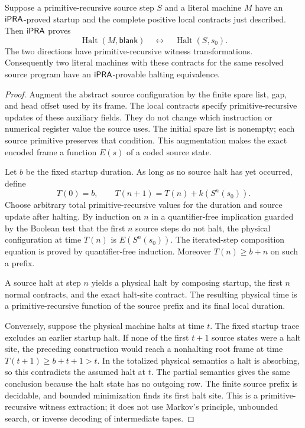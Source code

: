 \begin{theorem}\label{thm:physical}
Suppose a primitive-recursive source step $S$ and a literal machine $M$
have an $\mathsf{iPRA}$-proved startup and the complete positive local contracts
just described. Then $\mathsf{iPRA}$ proves
\[
 \operatorname{Halt}(M,\mathsf{blank})
 \quad\longleftrightarrow\quad
 \operatorname{Halt}(S,s_0).
\]
The two directions have primitive-recursive witness transformations.
Consequently two literal machines with these contracts for the same
resolved source program have an $\mathsf{iPRA}$-provable halting equivalence.
\end{theorem}
\begin{proof}
Augment the abstract source configuration by the finite spare list, gap,
and head offset used by its frame. The local contracts specify
primitive-recursive updates of these auxiliary fields. They do not change
which instruction or numerical register value the source uses. The
initial spare list is nonempty; each source primitive preserves that
condition. This augmentation makes the exact encoded frame a function
$E(s)$ of a coded source state.

Let $b$ be the fixed startup duration. As long as no source halt has yet
occurred, define
\[
 T(0)=b,\qquad T(n+1)=T(n)+k(S^n(s_0)).
\]
Choose arbitrary total primitive-recursive values for the duration and
source update after halting. By induction on $n$ in a quantifier-free
implication guarded by the Boolean test that the first $n$ source steps
do not halt, the physical configuration at time $T(n)$ is $E(S^n(s_0))$.
The iterated-step composition equation is proved by quantifier-free
induction. Moreover $T(n)\ge b+n$ on such a prefix.

A source halt at step $n$ yields a physical halt by composing startup,
the first $n$ normal contracts, and the exact halt-site contract.
The resulting physical time is a primitive-recursive function of the
source prefix and its final local duration.

Conversely, suppose the physical machine halts at time $t$. The fixed
startup trace excludes an earlier startup halt. If none of the first
$t+1$ source states were a halt site, the preceding construction would
reach a nonhalting root frame at time $T(t+1)\ge b+t+1>t$.
In the totalized physical semantics a halt is absorbing, so this
contradicts the assumed halt at $t$. The partial semantics gives the same
conclusion because the halt state has no outgoing row. The finite source
prefix is decidable, and bounded minimization finds its first halt site.
This is a primitive-recursive witness extraction; it does not use Markov's
principle, unbounded search, or inverse decoding of intermediate tapes.
\end{proof}


